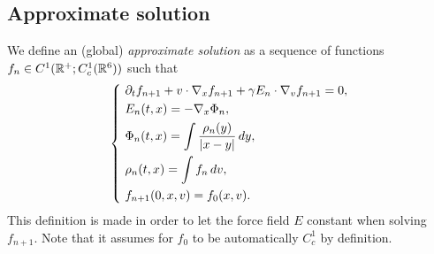 \documentclass{article}
\begin{document}
\subsection{Approximate solution}

\begin{defn}
We define an (global) \emph{approximate solution} as a sequence of functions $f_n\in C^1(\mathbb{R}^+;C_c^1(\mathbb{R}^6))$ such that
\[\left\{\ \begin{alignedat}{2}
&\pd_tf_{n+1}+v\cdot\nabla_xf_{n+1}+\gamma E_n\cdot\nabla_vf_{n+1}=0,\\
&E_n(t,x)=-\nabla_x\Phi_n,\\
&\Phi_n(t,x)=\int\frac{\rho_n(y)}{|x-y|}\,dy,\\
&\rho_n(t,x)=\int f_n\,dv,\\
&f_{n+1}(0,x,v)=f_0(x,v).
\end{alignedat}\right.\]
This definition is made in order to let the force field $E$ constant when solving $f_{n+1}$.
Note that it assumes for $f_0$ to be automatically $C_c^1$ by definition.
\end{defn}
\end{document}
